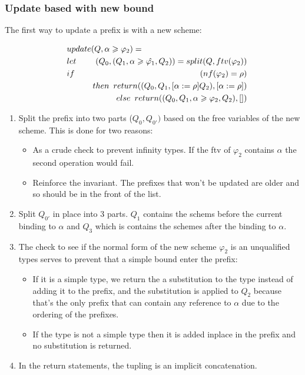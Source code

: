 \documentclass[twoside, titlepage, openright, a4paper]{book}
\renewcommand{\geq}{\geqslant}
\begin{document}
\subsubsection{Update based with new bound}
The first way to update a prefix is with a new scheme:

\begin{eqnarray*}
\lefteqn{update(Q, \alpha \geq \varphi_2) =} \\
\hspace{10pt} &let & (Q_0, (Q_1, \alpha \geq \hat{\varphi_1}, Q_2)) = split(Q, ftv(\varphi_2)) \\
              &if & (nf(\varphi_2)= \rho) \\
              &\hspace{5pt}& \hspace{10pt} then \hspace{5pt} return ((Q_0, Q_1, \lbrack \alpha := \rho \rbrack Q_2), \lbrack \alpha := \rho \rbrack) \\
              &\hspace{5pt}& \hspace{10pt} else \hspace{5pt} return ((Q_0, Q_1, \alpha \geq \varphi_2, Q_2), \lbrack \rbrack)
\end{eqnarray*}

\begin{enumerate}
\item{ Split the prefix into two parts ($Q_0, Q_{0'})$ based on the free variables of the new scheme. This is done for two reasons:  
		\begin{itemize}
		\item As a crude check to prevent infinity types. If the ftv of $\varphi_2$ contains $\alpha$ the second operation would fail.
		\item Reinforce the invariant. The prefixes that won't be updated are older and so should be in the front of the list.
		\end{itemize}
     }
\item Split $Q_{0'}$ in place into 3 parts. $Q_1$ contains the schems before the current binding to $\alpha$ and $Q_3$ which is contains the schemes after the binding to $\alpha$.
\item{ The check to see if the normal form of the new scheme $\varphi_2$ is an unqualified types serves to prevent that a simple bound enter the prefix:
		\begin{itemize}
		\item If it is a simple type, we return the a substitution to the type instead of adding it to the prefix, and the substitution is applied to $Q_2$ because that's the only prefix that can contain any reference to $\alpha$ due to the ordering of the prefixes.
		\item If the type is not a simple type then it is added inplace in the prefix and no substitution is returned.
		\end{itemize}
     }
\item In the return statements, the tupling is an implicit concatenation. 
\end{enumerate}
\end{document}
